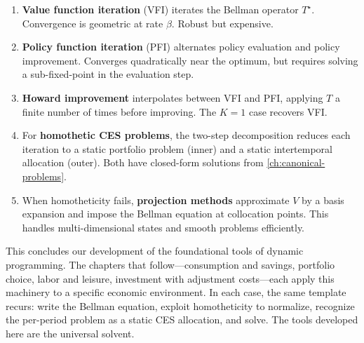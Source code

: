 \begin{calloutimportant}
\begin{enumerate}[label=(\roman*), leftmargin=2em]
    \item \textbf{Value function iteration} (VFI) iterates the Bellman operator $T^\star$. Convergence is geometric at rate $\beta$. Robust but expensive.
    
    \item \textbf{Policy function iteration} (PFI) alternates policy evaluation and policy improvement. Converges quadratically near the optimum, but requires solving a sub-fixed-point in the evaluation step.
    
    \item \textbf{Howard improvement} interpolates between VFI and PFI, applying $T$ a finite number of times before improving. The $K=1$ case recovers VFI.
    
    \item For \textbf{homothetic CES problems}, the two-step decomposition reduces each iteration to a static portfolio problem (inner) and a static intertemporal allocation (outer). Both have closed-form solutions from \cref{ch:canonical-problems}.
    
    \item When homotheticity fails, \textbf{projection methods} approximate $V$ by a basis expansion and impose the Bellman equation at collocation points. This handles multi-dimensional states and smooth problems efficiently.
\end{enumerate}
\end{calloutimportant}

This concludes our development of the foundational tools of dynamic programming. The chapters that follow---consumption and savings, portfolio choice, labor and leisure, investment with adjustment costs---each apply this machinery to a specific economic environment. In each case, the same template recurs: write the Bellman equation, exploit homotheticity to normalize, recognize the per-period problem as a static CES allocation, and solve. The tools developed here are the universal solvent.
